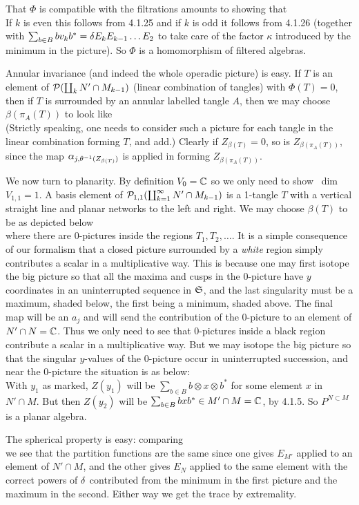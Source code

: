 That $\Phi$ is compatible with the filtrations amounts to showing
that
\[

\]
If $k$ is even this follows from 4.1.25 and if $k$ is odd it
follows from 4.1.26 (together with $\sum_{b\in B} bv_kb^*=\delta
E_kE_{k-1}\dots E_2$  to take care of the factor $\kappa$
introduced by the minimum in the picture). So $\Phi$ is a
homomorphism of filtered algebras.

Annular invariance (and indeed the whole operadic picture) is easy.
If $T$ is an element of ${\cal P}(\coprod_k N'\cap M_{k-1})$ (linear
combination of tangles) with $\Phi(T)=0$, then if $T$ is surrounded
by an annular labelled tangle $A$, then we may choose
$\beta(\pi_A(T))$ to look like
\[
        
\]
\ni (Strictly speaking, one needs to consider such a picture for
each tangle in the linear combination forming $T$, and add.)
Clearly if $Z_{\beta(T)}=0$, so is $Z_{\beta(\pi_A(T))}$, since the
map $\alpha_{j,\theta^{-1}(Z_{\beta(T)})}$ is applied in forming
$Z_{\beta(\pi_A(T))}$.

We now turn to planarity. By definition $V_0=\Bbb C$ so we only
need to show \ dim $V_{1,1}=1$.  A basis element of
${\cal P}_{1,1}(\coprod^\infty_{k=1} N'\cap M_{k-1})$ is a 1-tangle $T$
with a vertical straight line and planar networks to the left and
right. We may choose $\beta(T)$ to be as depicted below
\[
        
\]
\ni where there are 0-pictures inside
 the regions $T_1,T_2,\dots$. It is a simple consequence of our
formalism that a closed picture surrounded by a {\it white} region
simply contributes a scalar in a multiplicative way. This is
because one may first isotope the big picture so that all the
maxima and cusps in the 0-picture have $y$ coordinates in an
uninterrupted sequence in $\frak S$, and the last singularity must
be a maximum, shaded below, the first being a minimum, shaded
above. The final map will be an $a_j$ and will send the
contribution of the 0-picture to an element of $N'\cap N=\Bbb
C$. Thus we only need to see that 0-pictures inside a black
region contribute a scalar in a multiplicative way. But we may
isotope the big picture so that the singular $y$-values of the
0-picture occur in uninterrupted succession, and near the
0-picture the situation is as below:
\[
        
\]
\ni With $y_1$ as marked, $Z(y_1)$ will be $\sum_{b\in B}
b\otimes x\otimes b^*$ for some element $x$ in $N'\cap M$.
But then $Z(y_2)$ will be $\sum_{b\in B} bxb^*\in M'\cap M=\Bbb C$,
by 4.1.5.  So $P^{N\subset M}$ is a planar algebra.

The spherical property is easy: comparing
\bs
\[
        
\]
\bs\ni we see that the partition
functions are the same since one gives $E_{M'}$ applied to an
element of $N'\cap M$, and the other gives $E_N$ applied to the
same element with the correct powers of $\delta$ contributed from the
minimum in the first picture and the maximum in the second. Either
way we get the trace by extremality.

